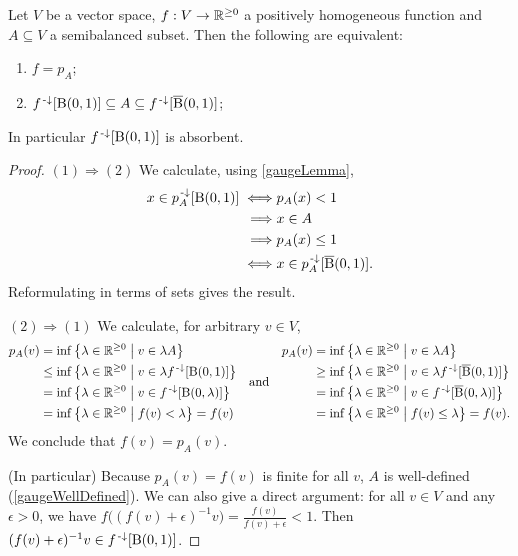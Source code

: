 \begin{lemma} \label{gaugeClassificationLemma}
Let $V$ be a vector space, $f: V\to \mathbb{R}^{\geq 0}$ a positively homogeneous function and $A \subseteq V$ a semibalanced subset.
Then the following are equivalent:
\begin{enumerate}
\item $f = p_A$;
\item $f^{{\text{\hspace{0.15em}-}\downarrow}}[\operatorname{B}(0,1)] \subseteq A \subseteq f^{{\text{\hspace{0.15em}-}\downarrow}}[\operatorname{\overline{B}}(0,1)]$;
\end{enumerate}
In particular $f^{{\text{\hspace{0.15em}-}\downarrow}}[\operatorname{B}(0,1)]$ is absorbent.
\end{lemma}
\begin{proof}
$(1) \Rightarrow (2)$ We calculate, using \ref{gaugeLemma},
\begin{align*}
x\in p_{A}^{\text{\hspace{0.15em}-}\downarrow}[\operatorname{B}(0,1)] \iff& p_{A}(x) < 1 \\
\implies& x\in A \\
\implies& p_{A}(x) \leq 1 \\
\iff& x\in p_{A}^{\text{\hspace{0.15em}-}\downarrow}[\operatorname{\overline{B}}(0,1)].
\end{align*}
Reformulating in terms of sets gives the result.

$(2) \Rightarrow (1)$ We calculate, for arbitrary $v\in V$,
\[ \begin{aligned}
p_A(v) &= \inf\left\{ \lambda\in \mathbb{R}^{\geq 0} \;\middle|\; v\in \lambda A \right\} \\
&\leq \inf\left\{ \lambda\in \mathbb{R}^{\geq 0} \;\middle|\; v\in \lambda f^{{\text{\hspace{0.15em}-}\downarrow}}[\operatorname{B}(0,1)] \right\} \\
&= \inf\left\{ \lambda\in \mathbb{R}^{\geq 0} \;\middle|\; v\in f^{{\text{\hspace{0.15em}-}\downarrow}}[\operatorname{B}(0,\lambda)] \right\} \\
&= \inf\left\{ \lambda\in \mathbb{R}^{\geq 0} \;\middle|\; f(v) < \lambda \right\} = f(v)
\end{aligned} \quad\text{and}\quad \begin{aligned}
p_A(v) &= \inf\left\{ \lambda\in \mathbb{R}^{\geq 0} \;\middle|\; v\in \lambda A \right\} \\
&\geq \inf\left\{ \lambda\in \mathbb{R}^{\geq 0} \;\middle|\; v\in \lambda f^{{\text{\hspace{0.15em}-}\downarrow}}[\operatorname{\overline{B}}(0,1)] \right\} \\
&= \inf\left\{ \lambda\in \mathbb{R}^{\geq 0} \;\middle|\; v\in f^{{\text{\hspace{0.15em}-}\downarrow}}[\operatorname{\overline{B}}(0,\lambda)] \right\} \\
&= \inf\left\{ \lambda\in \mathbb{R}^{\geq 0} \;\middle|\; f(v) \leq \lambda \right\} = f(v).
\end{aligned} \]
We conclude that $f(v) = p_A(v)$.

(In particular) Because $p_A(v) = f(v)$ is finite for all $v$, $A$ is well-defined (\ref{gaugeWellDefined}). We can also give a direct argument: for all $v\in V$ and any $\epsilon > 0$, we have $f\big((f(v)+\epsilon)^{-1}v\big) = \frac{f(v)}{f(v)+\epsilon} < 1$. Then $(f(v)+\epsilon)^{-1}v\in f^{\text{\hspace{0.15em}-}\downarrow}[\operatorname{B}(0,1)]$.
\end{proof}

